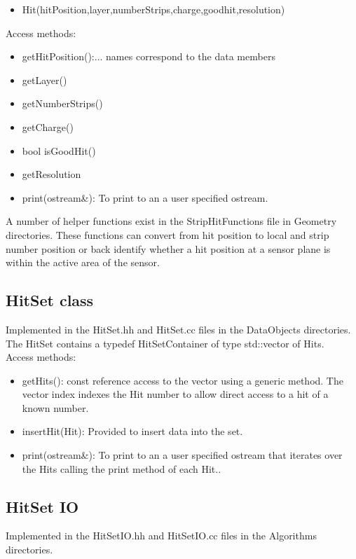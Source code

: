 \documentclass[aps,prd,superscriptaddress,floatfix]{revtex4}
\begin{document}
\begin{itemize}
\item Hit(hitPosition,layer,numberStrips,charge,goodhit,resolution)
\end{itemize}

Access methods:
\begin{itemize}
\item getHitPosition():... names correspond to the data members
\item getLayer()
\item getNumberStrips()
\item getCharge()
\item bool isGoodHit()
\item getResolution
\item print(ostream\&): To print to an a user specified ostream.
\end{itemize}

A number of helper functions exist in the StripHitFunctions file in Geometry directories.  These functions
can convert from hit position to local and strip number position or back identify whether a hit position at a sensor
plane is within the active area of the sensor.
\\

\subsection{HitSet class}
Implemented in the HitSet.hh and HitSet.cc files in the DataObjects directories.
\\

The HitSet contains a typedef HitSetContainer of type std::vector of Hits.
\\

Access methods:

\begin{itemize}
\item getHits(): const reference access to the vector using a generic method.
The vector index indexes the Hit number to allow direct access to a hit of a known number.

\item insertHit(Hit): Provided to insert data into the set.

\item print(ostream\&): To print to an a user specified ostream that iterates over
the Hits calling the print method of each Hit..
\end{itemize}

\subsection{HitSet IO}
Implemented in the HitSetIO.hh and HitSetIO.cc files in the Algorithms directories.
\\
\end{document}
